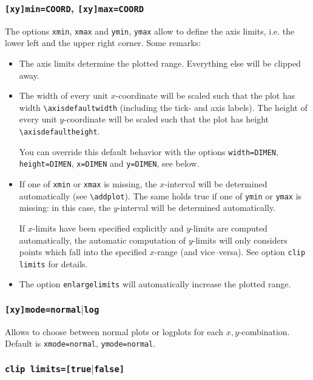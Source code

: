 \subsubsection{\texttt{[xy]min=COORD}, \texttt{[xy]max=COORD}}
The options \texttt{xmin}, \texttt{xmax} and \texttt{ymin}, \texttt{ymax} allow to define the axis limits, i.e. the lower left and the upper right corner. Some remarks:
\begin{itemize}
	\item The axis limits determine the plotted range. Everything else will be clipped away.
	\item The width of every unit $x$-coordinate will be scaled such that the plot has width \lstinline!\axisdefaultwidth! (including the tick- and axis labels). The height of every unit $y$-coordinate will be scaled such that the plot has height \lstinline!\axisdefaultheight!.

	You can override this default behavior with the options \lstinline!width=DIMEN!, \lstinline!height=DIMEN!, \lstinline!x=DIMEN! and \lstinline!y=DIMEN!, see below.
	\item If one of \lstinline!xmin! or \lstinline!xmax! is missing, the $x$-interval will be determined automatically (see \lstinline!\addplot!). The same holds true if one of \lstinline!ymin! or \lstinline!ymax! is missing: in this case, the $y$-interval will be determined automatically.

	If $x$-limits have been specified explicitly and $y$-limits are computed automatically, the automatic computation of $y$-limits will only considers points which fall into the specified $x$-range (and vice--versa). See option \texttt{clip limits} for details.

	\item The option \lstinline!enlargelimits! will automatically increase the plotted range.
\end{itemize}

\subsubsection{\texttt{[xy]mode=normal$|$log}}
Allows to choose between normal plots or logplots for each $x,y$-combination. Default is \lstinline!xmode=normal!, \lstinline!ymode=normal!.


\subsubsection{\texttt{clip limits=[true$|$false]}}

